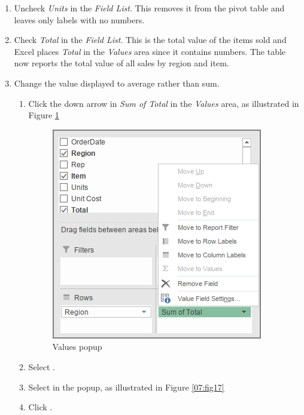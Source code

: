 \begin{enumerate}[resume]
	\item Uncheck \textit{Units} in the \textit{Field List}. This removes it from the pivot table and leaves only labels with no numbers.
	\item Check \textit{Total} in the \textit{Field List}. This is the total value of the items sold and Excel places \textit{Total} in the \textit{Values} area since it contains numbers. The table now reports the total value of all sales by region and item.
	\item Change the value displayed to average rather than sum.
	
	\begin{enumerate}
		\item Click the down arrow in \textit{Sum of Total} in the \textit{Values} area, as illustrated in Figure \ref{07:fig16}

		\begin{figure}[H]
			\centering
			\includegraphics[width=\maxwidth{.75\linewidth}]{gfx/ch07_fig16}
			\caption{Values popup}
			\label{07:fig16}
		\end{figure}

		\item Select .
		\item Select  in the popup, as illustrated in Figure \ref{07:fig17}
		\item Click .
	\end{enumerate}


\end{enumerate}
